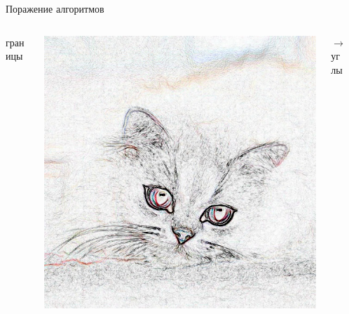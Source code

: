 \documentclass[aspectratio=169, professionalfonts]{beamer}
\begin{document}
\begin{frame}{Поражение алгоритмов}
\begin{columns}
\begin{column}{.15\linewidth}
            границы
        \end{column}
        \begin{column}{.25\linewidth}
            \includegraphics[width=\linewidth]{graphs/fig15_1.jpg}
        \end{column}
        \begin{column}{.15\linewidth}
            \centering
            \( \longrightarrow \) \\
            углы
        \end{column}
        \begin{column}{.07\linewidth}

\end{column}
\end{columns}
\end{frame}
\end{document}
